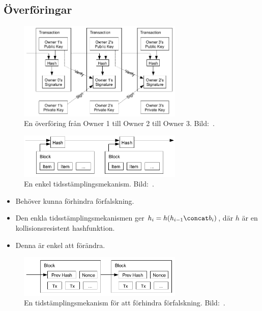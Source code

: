 \documentclass{beamer}
\begin{document}
\subsection{Överföringar}

\begin{frame}{\insertsubsectionhead}
  \begin{figure}
    \includegraphics[width=0.7\textwidth]{bitcoin-transfer.png}
    \caption{En överföring från Owner 1 till Owner 2 till Owner 3.
    Bild:~\cite{Nakamoto2008bap}.}
  \end{figure}
\end{frame}

\begin{frame}{\insertsubsectionhead}
  \begin{figure}
    \includegraphics[width=0.7\textwidth]{bitcoin-stamp.png}
    \caption{En enkel tidsstämplingsmekanism.
    Bild:~\cite{Nakamoto2008bap}.}
  \end{figure}
\end{frame}

\begin{frame}{\insertsubsectionhead}
  \begin{itemize}
    \item Behöver kunna förhindra förfalskning.
    \item Den enkla tidsstämplingsmekanismen ger \(h_i = h(h_{i-1}\concat 
      b_i)\), där \(h\) är en kollisionsresistent hashfunktion.
    \item Denna är enkel att förändra.
  \end{itemize}
\end{frame}

\begin{frame}{\insertsubsectionhead}
  \begin{figure}
    \includegraphics[width=0.7\textwidth]{bitcoin-pow.png}
    \caption{En tidstämplingsmekanism för att förhindra förfalskning.
    Bild:~\cite{Nakamoto2008bap}.}
  \end{figure}
\end{frame}
\end{document}
